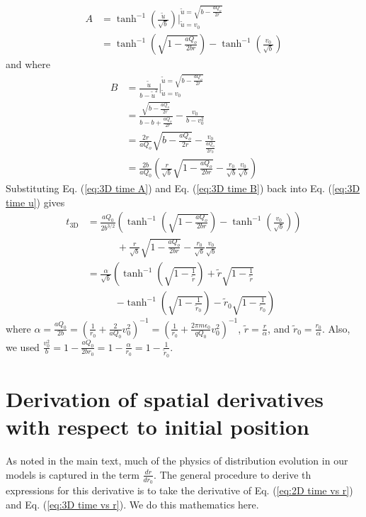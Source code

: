 \documentclass[aps,prl,twocolumn,showpacs,superscriptaddress,groupedaddress]{revtex4-1}  %
\begin{document}
\begin{align}
 A &= \tanh^{-1} \left( \frac{\tilde{u}}{\sqrt{b}}\right)\bigg \rvert_{\tilde{u} = v_0}^{\tilde{u}= \sqrt{b - \frac{a Q_o}{2  r}}} \nonumber\\
    &= \tanh^{-1} \left( \sqrt{1 -  \frac{a Q_o}{2  b r}} \right) - \tanh^{-1} \left(\frac{v_0}{\sqrt{b}}\right)\label{eq:3D time A}
\end{align}
and where
\begin{align}
 B &= \frac{\tilde{u}}{b - \tilde{u}^2}\bigg \rvert_{\tilde{u} = v_0}^{\tilde{u}= \sqrt{b - \frac{a Q_o}{2  r}}} \nonumber\\
    &= \frac{\sqrt{b - \frac{a Q_o}{2  r}}}{b - b + \frac{a Q_o}{2  r}} - \frac{v_0}{b - v_0^2}\nonumber\\
    &=  \frac{2  r}{a Q_o}\sqrt{b - \frac{a Q_o}{2  r}} - \frac{v_0}{\frac{a Q_o}{2  r_0}}\nonumber\\
    &= \frac{2 b}{a Q_0} \left(\frac{r}{\sqrt{b}}\sqrt{1 - \frac{a Q_o}{2 b r}} - \frac{r_0}{\sqrt{b}} \frac{v_0}{\sqrt{b}}\right)\label{eq:3D time B}
\end{align}
Substituting Eq. (\ref{eq:3D time A}) and Eq. (\ref{eq:3D time B}) back into Eq. (\ref{eq:3D time u}) gives
\begin{align}
  t_\text{3D} &=  \frac{a Q_0}{2 b^{3/2}} \left( \tanh^{-1} \left( \sqrt{1 -  \frac{a Q_o}{2  b r}} \right) - \tanh^{-1} \left(\frac{v_0}{\sqrt{b}}\right) \right) \nonumber\\
                    &\quad\quad\quad+ \frac{r}{\sqrt{b}}\sqrt{1 - \frac{a Q_o}{2 b r}} - \frac{r_0}{\sqrt{b}} \frac{v_0}{\sqrt{b}}\nonumber\\
                    &= \frac{\alpha}{\sqrt{b}} \left( \tanh^{-1} \left( \sqrt{1 -  \frac{1}{\tilde{r}}} \right) + \tilde{r}\sqrt{1 -  \frac{1}{\tilde{r}}} \right.\nonumber\\
                    &\quad\quad\quad \left.- \tanh^{-1} \left(\sqrt{1 -  \frac{1}{\tilde{r}_0}}\right) - \tilde{r}_0\sqrt{1 -  \frac{1}{\tilde{r}_0}}\right)\label{eq:3D time vs r}
\end{align}
where $\alpha = \frac{a Q_0}{2 b} = \left(\frac{1}{r_0} +\frac{2}{a Q_0} v_0^2\right)^{-1} = \left(\frac{1}{r_0} +\frac{2 \pi m \epsilon_0}{q Q_0} v_0^2\right)^{-1}$, 
$\tilde{r} = \frac{r}{\alpha}$, and $\tilde{r}_0 = \frac{r_0}{\alpha}$.  Also, we used $\frac{v_0^2}{b} = 1 - \frac{aQ_0}{2b r_0} = 1 - \frac{\alpha}{r_0} = 1 - \frac{1}{\tilde{r}_0}$.

\section{Derivation of spatial derivatives with respect to initial position}
As noted in the main text, much of the physics of distribution evolution in our models is captured in the term $\frac{dr}{dr_0}$.  
The general procedure to derive th expressions for this derivative is to take the derivative of Eq. (\ref{eq:2D time vs r}) and Eq.
(\ref{eq:3D time vs r}).  We do this mathematics here.
\end{document}
